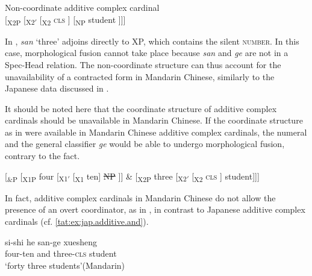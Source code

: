 \documentclass[output=paper]{langscibook}
\begin{document}
\ea\label{tat:ex:chi.contraction.st2}
Non-coordinate additive complex cardinal
\\{[}\textsubscript{X2P}  [\textsubscript{X2$'$} [\textsubscript{X2} \textsc{cls} ] [\textsubscript{NP} student ]]]
\z

\noindent In , \textit{san} `three' adjoins directly to XP, which contains the silent \textsc{number}. In this case, morphological fusion cannot take place because \textit{san} and \textit{ge} are not in a Spec-Head relation. The non-coordinate structure can thus account for the unavailability of a contracted form in Mandarin Chinese, similarly to the Japanese data discussed in . 

It should be noted here that the coordinate structure of additive complex cardinals should be unavailable in Mandarin Chinese. If the coordinate structure as in  were available in Mandarin Chinese additive complex cardinals, the numeral  and the general classifier \textit{ge} would be able to undergo morphological fusion, contrary to the fact.

\ea\label{tat:ex:chi.IandM.structure}
{[}\textsubscript{\&P} [\textsubscript{X1P} four [\textsubscript{X1$'$} [\textsubscript{X1} ten] \sout{NP} ]] \& [\textsubscript{X2P} three [\textsubscript{X2$'$} [\textsubscript{X2} \textsc{cls} ] student]]]
\z

\noindent In fact, additive complex cardinals in Mandarin Chinese do not allow the presence of an overt coordinator, as in , in contrast to Japanese additive complex cardinals (cf. \ref{tat:ex:jap.additive.and}). 

\ea\label{tat:ex:chi.overt.coord}
\gll \llap{*}si-shi he san-ge xuesheng\\  
      four-ten and three-\textsc{cls} student\\ 
\glt `forty three students'\hfill(Mandarin)
\z
\end{document}
